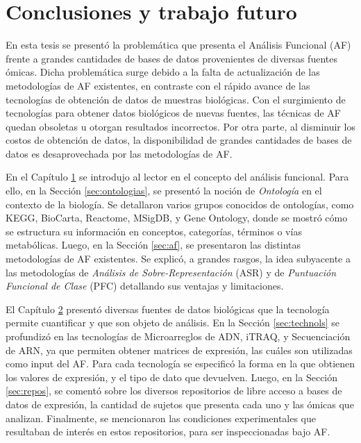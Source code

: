 \documentclass[12pt,twoside]{reedthesis}
\begin{document}
\hypertarget{cap:conclusiones}{%
\chapter{Conclusiones y trabajo futuro}\label{cap:conclusiones}}

\par

En esta tesis se presentó la problemática que presenta el Análisis Funcional (AF) frente a grandes cantidades de bases de datos provenientes de diversas fuentes ómicas. Dicha problemática surge debido a la falta de actualización de las metodologías de AF existentes, en contraste con el rápido avance de las tecnologías de obtención de datos de muestras biológicas. Con el surgimiento de tecnologías para obtener datos biológicos de nuevas fuentes, las técnicas de AF quedan obsoletas u otorgan resultados incorrectos. Por otra parte, al disminuir los costos de obtención de datos, la disponibilidad de grandes cantidades de bases de datos es desaprovechada por las metodologías de AF.

\par

En el Capítulo \protect\hyperlink{cap:af}{1} se introdujo al lector en el concepto del análisis funcional. Para ello, en la Sección \ref{sec:ontologias}, se presentó la noción de \emph{Ontología} en el contexto de la biología. Se detallaron varios grupos conocidos de ontologías, como KEGG, BioCarta, Reactome, MSigDB, y Gene Ontology, donde se mostró cómo se estructura su información en conceptos, categorías, términos o vías metabólicas. Luego, en la Sección \ref{sec:af}, se presentaron las distintas metodologías de AF existentes. Se explicó, a grandes rasgos, la idea subyacente a las metodologías de \emph{Análisis de Sobre-Representación} (ASR) y de \emph{Puntuación Funcional de Clase} (PFC) detallando sus ventajas y limitaciones.

\par

El Capítulo \protect\hyperlink{cap:ngs}{2} presentó diversas fuentes de datos biológicas que la tecnología permite cuantificar y que son objeto de análisis. En la Sección \ref{sec:technols} se profundizó en las tecnologías de Microarreglos de ADN, iTRAQ, y Secuenciación de ARN, ya que permiten obtener matrices de expresión, las cuáles son utilizadas como input del AF. Para cada tecnología se especificó la forma en la que obtienen los valores de expresión, y el tipo de dato que devuelven. Luego, en la Sección \ref{sec:repos}, se comentó sobre los diversos repositorios de libre acceso a bases de datos de expresión, la cantidad de sujetos que presenta cada uno y las ómicas que analizan. Finalmente, se mencionaron las condiciones experimentales que resultaban de interés en estos repositorios, para ser inspeccionadas bajo AF.
\end{document}

